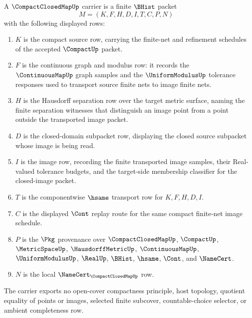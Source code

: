 \begin{definition}
\label{def:compact-closed-map-carrier}
A $\CompactClosedMapUp$ carrier is a finite $\BHist$ packet
$$
M=(K,F,H,D,I,T,C,P,N)
$$
with the following displayed rows:
\begin{enumerate}
\item $K$ is the compact source row, carrying the finite-net and refinement schedules of the accepted $\CompactUp$ packet.
\item $F$ is the continuous graph and modulus row: it records the $\ContinuousMapUp$ graph samples and the $\UniformModulusUp$ tolerance responses used to transport source finite nets to image finite nets.
\item $H$ is the Hausdorff separation row over the target metric surface, naming the finite separation witnesses that distinguish an image point from a point outside the transported image packet.
\item $D$ is the closed-domain subpacket row, displaying the closed source subpacket whose image is being read.
\item $I$ is the image row, recording the finite transported image samples, their Real-valued tolerance budgets, and the target-side membership classifier for the closed-image packet.
\item $T$ is the componentwise $\hsame$ transport row for $K,F,H,D,I$.
\item $C$ is the displayed $\Cont$ replay route for the same compact finite-net image schedule.
\item $P$ is the $\Pkg$ provenance over $\CompactClosedMapUp$, $\CompactUp$, $\MetricSpaceUp$, $\HausdorffMetricUp$, $\ContinuousMapUp$, $\UniformModulusUp$, $\RealUp$, $\BHist$, $\hsame$, $\Cont$, and $\NameCert$.
\item $N$ is the local $\NameCert_{\CompactClosedMapUp}$ row.
\end{enumerate}
The carrier exports no open-cover compactness principle, host topology, quotient equality of points or images, selected finite subcover, countable-choice selector, or ambient completeness row.
\end{definition}

